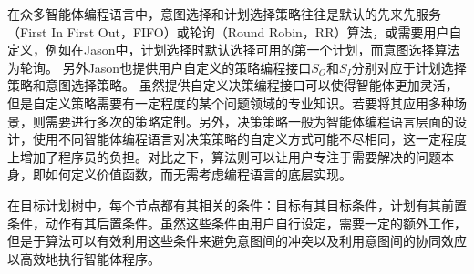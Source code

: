 %
在众多智能体编程语言中，意图选择和计划选择策略往往是默认的先来先服务（First In First Out，FIFO）或轮询（Round Robin，RR）算法，或需要用户自定义，例如在Jason\cite{bordini2007programming}中，计划选择时默认选择可用的第一个计划，而意图选择算法为轮询。
%
另外Jason也提供用户自定义的策略编程接口$S_O$和$S_I$分别对应于计划选择策略和意图选择策略。
虽然提供自定义决策编程接口可以使得智能体更加灵活，但是自定义策略需要有一定程度的某个问题领域的专业知识。若要将其应用多种场景，则需要进行多次的策略定制。另外，决策策略一般为智能体编程语言层面的设计，使用不同智能体编程语言对决策策略的自定义方式可能不尽相同，这一定程度上增加了程序员的负担。对比之下，\SA 算法则可以让用户专注于需要解决的问题本身，即如何定义价值函数，而无需考虑编程语言的底层实现。

%
在目标计划树中，每个节点都有其相关的条件：目标有其目标条件，计划有其前置条件，动作有其后置条件。虽然这些条件由用户自行设定，需要一定的额外工作，但是于\SA 算法可以有效利用这些条件来避免意图间的冲突以及利用意图间的协同效应以高效地执行智能体程序。
